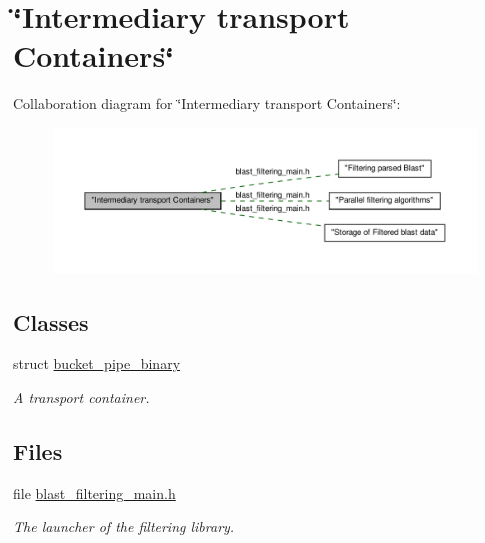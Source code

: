 \hypertarget{group__filter__transport__container}{
\section{\char`\"{}Intermediary transport Containers\char`\"{}}
\label{group__filter__transport__container}
}
Collaboration diagram for \char`\"{}Intermediary transport Containers\char`\"{}:\nopagebreak
\begin{figure}[H]
\begin{center}
\leavevmode
\includegraphics[width=400pt]{group__filter__transport__container}
\end{center}
\end{figure}
\subsection*{Classes}
\begin{DoxyCompactItemize}
\item 
struct \hyperlink{structbucket__pipe__binary}{bucket\_\-pipe\_\-binary}
\begin{DoxyCompactList}\small\item\em A transport container. \end{DoxyCompactList}\end{DoxyCompactItemize}
\subsection*{Files}
\begin{DoxyCompactItemize}
\item 
file \hyperlink{blast__filtering__main_8h}{blast\_\-filtering\_\-main.h}


\begin{DoxyCompactList}\small\item\em The launcher of the filtering library. \end{DoxyCompactList}

\end{DoxyCompactItemize}
